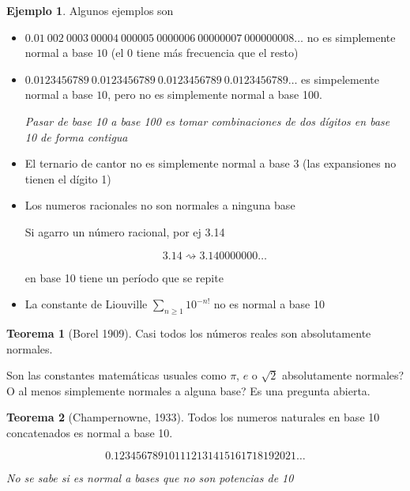 \documentclass{report}
\theoremstyle{definition} %
\newtheorem{theorem}{Teorema}[chapter]
\newtheorem*{exmp*}{Ejemplo}
\begin{document}
\begin{exmp*} Algunos ejemplos son

    \begin{itemize}
        \item $0.01 \ 002 \ 0003 \ 00004 \ 000005 \ 0000006 \ 00000007 \ 000000008 \dots$
        no es simplemente normal a base $10$ (el 0 tiene más frecuencia que el
        resto)
        \item $0.0123456789 \ 0.0123456789 \ 0.0123456789 \ 0.0123456789 \dots$ es
        simpelemente normal a base $10$, pero no es simplemente normal a base 100.
    
        \textit{Pasar de base 10 a base 100 es tomar combinaciones de dos dígitos en base 10 de forma contigua}
    
        \item El ternario de cantor no es simplemente normal a base 3 (las
        expansiones no tienen el dígito 1)
    
        \item Los numeros racionales no son normales a ninguna base
        
        Si agarro un número racional, por ej 3.14
    
        $$3.14 \rightsquigarrow 3.140000000\dots$$
        
        en base 10 tiene un período que se repite
    
        \item La constante de Liouville $\sum_{n \geq 1} 10^{-n!}$ no es normal a
        base 10
    \end{itemize}    
\end{exmp*}


\begin{theorem}[Borel 1909]
    Casi todos los números reales son absolutamente normales.
\end{theorem}

Son las constantes matemáticas usuales como $\pi$, $e$ o $\sqrt{2}$
absolutamente normales? O al menos simplemente normales a alguna base? Es una
pregunta abierta.

\begin{theorem}[Champernowne, 1933]

    Todos los numeros naturales en base 10 concatenados es normal a base 10.

    $$0.123456789101112131415161718192021\dots$$

    \textit{No se sabe si es normal a bases que no son potencias de 10}
    
\end{theorem}
\end{document}
